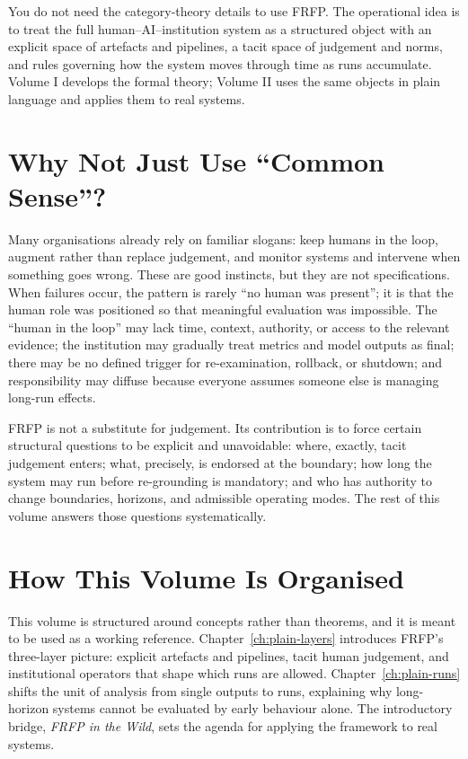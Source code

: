 You do not need the category-theory details to use FRFP. The operational idea is to treat the full human--AI--institution system as a structured object with an explicit space of artefacts and pipelines, a tacit space of judgement and norms, and rules governing how the system moves through time as runs accumulate. Volume I develops the formal theory; Volume II uses the same objects in plain language and applies them to real systems.

\section{Why Not Just Use ``Common Sense''?}

Many organisations already rely on familiar slogans: keep humans in the loop, augment rather than replace judgement, and monitor systems and intervene when something goes wrong. These are good instincts, but they are not specifications. When failures occur, the pattern is rarely ``no human was present''; it is that the human role was positioned so that meaningful evaluation was impossible. The ``human in the loop'' may lack time, context, authority, or access to the relevant evidence; the institution may gradually treat metrics and model outputs as final; there may be no defined trigger for re-examination, rollback, or shutdown; and responsibility may diffuse because everyone assumes someone else is managing long-run effects.

FRFP is not a substitute for judgement. Its contribution is to force certain structural questions to be explicit and unavoidable: where, exactly, tacit judgement enters; what, precisely, is endorsed at the boundary; how long the system may run before re-grounding is mandatory; and who has authority to change boundaries, horizons, and admissible operating modes. The rest of this volume answers those questions systematically.

\section{How This Volume Is Organised}

This volume is structured around concepts rather than theorems, and it is meant to be used as a working reference. Chapter~\ref{ch:plain-layers} introduces FRFP’s three-layer picture: explicit artefacts and pipelines, tacit human judgement, and institutional operators that shape which runs are allowed. Chapter~\ref{ch:plain-runs} shifts the unit of analysis from single outputs to runs, explaining why long-horizon systems cannot be evaluated by early behaviour alone. The introductory bridge, \emph{FRFP in the Wild}, sets the agenda for applying the framework to real systems.

